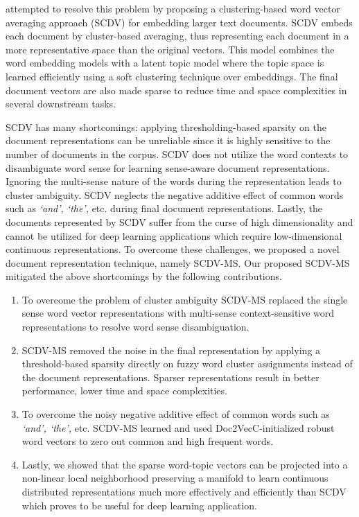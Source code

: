 \documentclass{ecai}
\newcommand{\method}{SCDV-MS}
\begin{document}
\cite{mekala2017scdv} attempted to resolve this problem by proposing a clustering-based word vector averaging approach (SCDV) for embedding larger text documents. SCDV embeds each document by cluster-based averaging, thus representing each document in a more representative space than the original vectors. This model combines the word embedding models with a latent topic model where the topic space is learned efficiently using a soft clustering technique over embeddings. The final document vectors are also made sparse to reduce time and space complexities in several downstream tasks. 

SCDV has many shortcomings: applying thresholding-based sparsity on the document representations can be unreliable since it is highly sensitive to the number of documents in the corpus. SCDV does not utilize the word contexts to disambiguate word sense for learning sense-aware document representations. Ignoring the multi-sense nature of the words during the representation leads to cluster ambiguity.  SCDV neglects the negative additive effect of common words such as \textit{`and', `the',} etc. during final document representations. Lastly, the documents represented by SCDV suffer from the curse of high dimensionality and cannot be utilized for deep learning applications which require low-dimensional continuous representations. To overcome these challenges, we proposed a novel document representation technique, namely \method{}. Our proposed \method{} mitigated the above shortcomings by the following contributions.




\begin{enumerate}
\setlength\itemsep{0.2em}
\item To overcome the problem of cluster ambiguity \method{} replaced the single sense word vector representations with multi-sense context-sensitive word representations to resolve word sense disambiguation.
\item \method{} removed the noise in the final representation by applying a threshold-based sparsity directly on fuzzy word cluster assignments instead of the document representations. Sparser representations result in better performance, lower time and space complexities.
\item To overcome the noisy negative additive effect of common words such as \textit{`and', `the',} etc. \method{} learned and used Doc2VecC-initialized \cite{chen2017efficient} robust word vectors to zero out common and high frequent words.
\item Lastly, we showed that the sparse word-topic vectors can be projected into a non-linear local neighborhood preserving a manifold to learn continuous distributed representations much more effectively and efficiently than SCDV which proves to be useful for deep learning application.
\end{enumerate}
\end{document}

